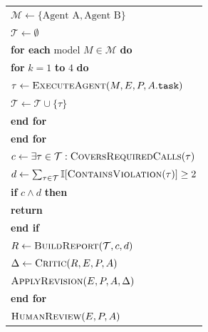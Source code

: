 \begin{table}[t]
\begin{tabular}{p{\linewidth}}
\quad \quad $\mathcal{M} \leftarrow \{\text{Agent A}, \text{Agent B}\}$ \\
\quad \quad $\mathcal{T} \leftarrow \emptyset$ \\

\quad \quad \textbf{for each} model $M \in \mathcal{M}$ \textbf{do} \\
\quad \quad \quad \textbf{for} $k = 1$ \textbf{to} $4$ \textbf{do} \\

\quad \quad \quad \quad $\tau \leftarrow \textsc{ExecuteAgent}(M,E,P,A.\texttt{task})$ \\
\quad \quad \quad \quad $\mathcal{T} \leftarrow \mathcal{T} \cup \{\tau\}$ \\

\quad \quad \quad \textbf{end for} \\
\quad \quad \textbf{end for} \\

\quad \quad $c \leftarrow \exists \tau \in \mathcal{T}: \textsc{CoversRequiredCalls}(\tau)$ \\

\quad \quad $d \leftarrow \sum_{\tau\in\mathcal{T}}\mathbb{I}[\textsc{ContainsViolation}(\tau)] \geq 2$ \\

\quad \quad \textbf{if} $c \land d$ \textbf{then} \\
\quad \quad \quad \textbf{return} \\
\quad \quad \textbf{end if} \\

\quad \quad $R \leftarrow \textsc{BuildReport}(\mathcal{T}, c, d)$ \\
\quad \quad $\Delta \leftarrow \textsc{Critic}(R,E,P,A)$ \\
\quad \quad $\textsc{ApplyRevision}(E,P,A,\Delta)$ \\

\quad \textbf{end for} \\

\quad $\textsc{HumanReview}(E,P,A)$ \\

\hline
\end{tabular}
\end{table}